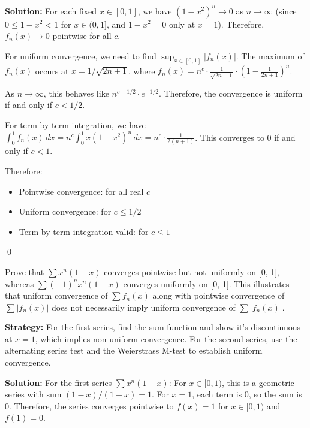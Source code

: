 \bigskip\noindent\textbf{Solution:} For each fixed \( x \in [0, 1] \), we have \( (1 - x^2)^n \to 0 \) as \( n \to \infty \) (since \( 0 \leq 1 - x^2 < 1 \) for \( x \in (0, 1] \), and \( 1 - x^2 = 0 \) only at \( x = 1 \)). Therefore, \( f_n(x) \to 0 \) pointwise for all \( c \).

For uniform convergence, we need to find \( \sup_{x \in [0,1]} |f_n(x)| \). The maximum of \( f_n(x) \) occurs at \( x = 1/\sqrt{2n + 1} \), where \( f_n(x) = n^c \cdot \frac{1}{\sqrt{2n + 1}} \cdot \left(1 - \frac{1}{2n + 1}\right)^n \).

As \( n \to \infty \), this behaves like \( n^{c - 1/2} \cdot e^{-1/2} \). Therefore, the convergence is uniform if and only if \( c < 1/2 \).

For term-by-term integration, we have \( \int_0^1 f_n(x) \, dx = n^c \int_0^1 x(1 - x^2)^n \, dx = n^c \cdot \frac{1}{2(n + 1)} \). This converges to 0 if and only if \( c < 1 \).

Therefore:
\begin{itemize}
\item Pointwise convergence: for all real \( c \)
\item Uniform convergence: for \( c \le 1/2 \)
\item Term-by-term integration valid: for \( c \le 1 \)
\end{itemize}\qed


\begin{problembox}
Prove that \( \sum x^n (1 - x) \) converges pointwise but not uniformly on [0, 1], whereas \( \sum (-1)^n x^n (1 - x) \) converges uniformly on [0, 1]. This illustrates that uniform convergence of \( \sum f_n(x) \) along with pointwise convergence of \( \sum |f_n(x)| \) does not necessarily imply uniform convergence of \( \sum |f_n(x)| \).
\end{problembox}

\noindent\textbf{Strategy:} For the first series, find the sum function and show it's discontinuous at \( x = 1 \), which implies non-uniform convergence. For the second series, use the alternating series test and the Weierstrass M-test to establish uniform convergence.

\bigskip\noindent\textbf{Solution:} For the first series \( \sum x^n (1 - x) \): For \( x \in [0, 1) \), this is a geometric series with sum \( (1 - x)/(1 - x) = 1 \). For \( x = 1 \), each term is 0, so the sum is 0. Therefore, the series converges pointwise to \( f(x) = 1 \) for \( x \in [0, 1) \) and \( f(1) = 0 \).

